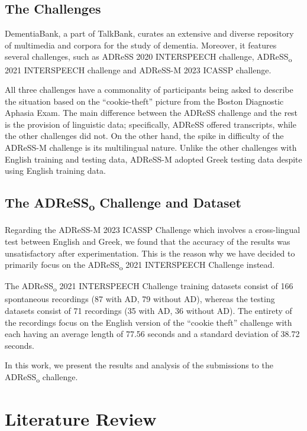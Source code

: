 \documentclass[journal]{IEEEtran}
\begin{document}
\subsection{The Challenges}

DementiaBank\cite{weiss2012dementiabank}, a part of TalkBank, curates an extensive and diverse repository of multimedia and corpora for the study of dementia. Moreover, it features several challenges, such as ADReSS 2020 INTERSPEECH challenge, ADReSS\textsubscript{o} 2021 INTERSPEECH challenge and ADReSS-M 2023 ICASSP challenge.

All three challenges have a commonality of participants being asked to describe the situation based on the ``cookie-theft'' picture from the Boston Diagnostic Aphasia Exam\cite{BADE}. The main difference between the ADReSS challenge and the rest is the provision of linguistic data; specifically, ADReSS offered transcripts, while the other challenges did not. On the other hand, the spike in difficulty of the ADReSS-M challenge is its multilingual nature. Unlike the other challenges with English training and testing data, ADReSS-M adopted Greek testing data despite using English training data.

\subsection{The ADReSS\textsubscript{o} Challenge and Dataset}

Regarding the ADReSS-M 2023 ICASSP Challenge which involves a cross-lingual test between English and Greek, we found that the accuracy of the results was unsatisfactory after experimentation. This is the reason why we have decided to primarily focus on the ADReSS\textsubscript{o} 2021 INTERSPEECH Challenge instead.

The ADReSS\textsubscript{o} 2021 INTERSPEECH Challenge training datasets consist of 166 spontaneous recordings (87 with AD, 79 without AD), whereas the testing datasets consist of 71 recordings (35 with AD, 36 without AD). The entirety of the recordings focus on the English version of the ``cookie theft'' challenge with each having an average length of 77.56 seconds and a standard deviation of 38.72 seconds.

In this work, we present the results and analysis of the submissions to the ADReSS\textsubscript{o} challenge.

\section{Literature Review}
\end{document}

